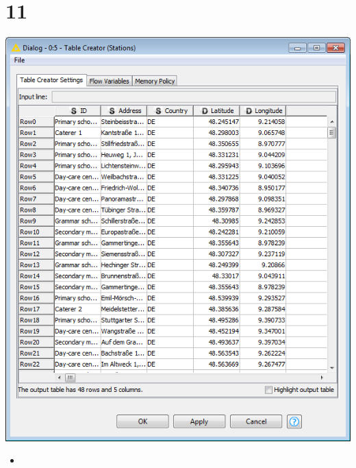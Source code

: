 \documentclass{beamer}
\begin{document}
\section{11}
\begin{frame}
	\begin{center}
  		\includegraphics[height=0.6\textheight]{11.png}
	\end{center}
	\begin{itemize}
		\item
	\end{itemize}
\end{frame}
\end{document}
